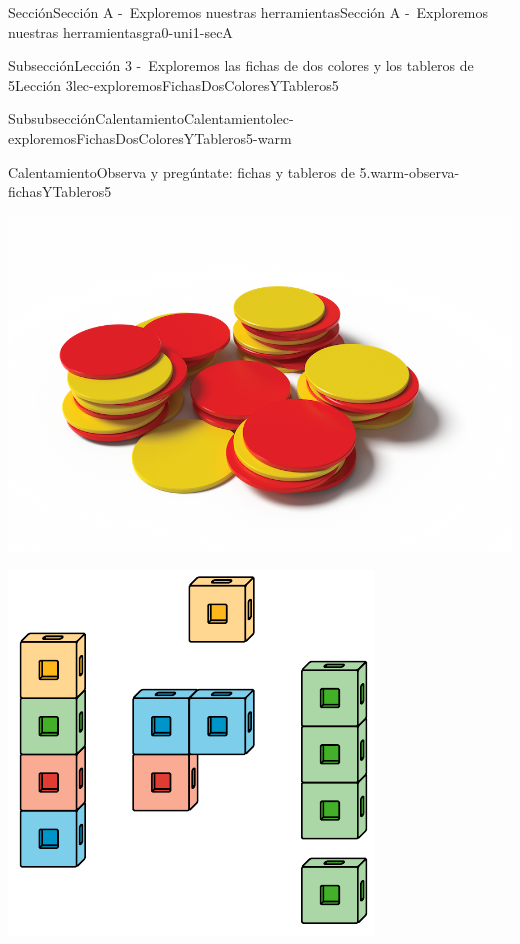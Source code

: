 \documentclass[twoside,10pt,]{article}
\begin{document}
\begin{sectionptx}{Sección}{Sección A -~Exploremos nuestras herramientas}{}{Sección A -~Exploremos nuestras herramientas}{}{}{gra0-uni1-secA}
\begin{subsectionptx}{Subsección}{Lección 3 -~Exploremos las fichas de dos colores y los tableros de 5}{}{Lección 3}{}{}{lec-exploremosFichasDosColoresYTableros5}
\begin{subsubsectionptx}{Subsubsección}{Calentamiento}{}{Calentamiento}{}{}{lec-exploremosFichasDosColoresYTableros5-warm}
\begin{exploration}{Calentamiento}{Observa y pregúntate: fichas y tableros de 5.}{warm-observa-fichasYTableros5}
\begin{sidebyside}{2}{0.05}{0.05}{0.1}
\begin{sbspanel}{0.4}
\includegraphics[width=\linewidth]{external/png-source/K.1.A Beta Student Workbook.RedYellowChips_withShadow.png}
\end{sbspanel}%
\end{sidebyside}%
\begin{sidebyside}{2}{0.05}{0.05}{0.1}%
\begin{sbspanel}{0.4}%
\includegraphics[width=\linewidth]{external/svg-source/tikz-file-128850.pdf}
\end{sbspanel}%
\begin{sbspanel}{0.4}%

\end{sbspanel}
\end{sidebyside}
\end{exploration}
\end{subsubsectionptx}
\end{subsectionptx}
\end{sectionptx}
\end{document}
